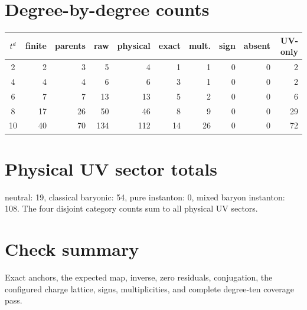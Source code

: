 \documentclass{article}
\begin{document}
\section{Degree-by-degree counts}
\begin{center}\begin{tabular}{c|rrrrrrrrr}\toprule
$t^d$&finite&parents&raw&physical&exact&mult.&sign&absent&UV-only\\\midrule
2&2&3&5&4&1&1&0&0&2\\
4&4&4&6&6&3&1&0&0&2\\
6&7&7&13&13&5&2&0&0&6\\
8&17&26&50&46&8&9&0&0&29\\
10&40&70&134&112&14&26&0&0&72\\
\bottomrule\end{tabular}\end{center}
\section{Physical UV sector totals} neutral: 19, classical baryonic: 54, pure instanton: 0, mixed baryon instanton: 108. The four disjoint category counts sum to all physical UV sectors.
\section{Check summary} Exact anchors, the expected map, inverse, zero residuals, conjugation, the configured charge lattice, signs, multiplicities, and complete degree-ten coverage pass.
\end{document}
